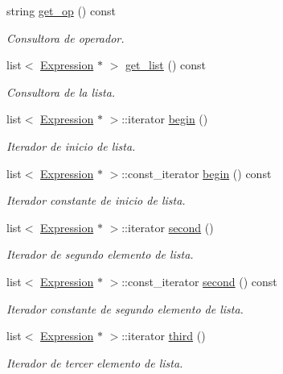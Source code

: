 \begin{DoxyCompactItemize}
string \hyperlink{class_expression_a9216cba5bbd3ffa8c3a625a66b91b36f}{get\+\_\+op} () const 
\begin{DoxyCompactList}\small\item\em Consultora de operador. \end{DoxyCompactList}\item 
list$<$ \hyperlink{class_expression}{Expression} $\ast$ $>$ \hyperlink{class_expression_a02b464bb904f9e47806c3ace82f9ce40}{get\+\_\+list} () const 
\begin{DoxyCompactList}\small\item\em Consultora de la lista. \end{DoxyCompactList}\item 
list$<$ \hyperlink{class_expression}{Expression} $\ast$ $>$\+::iterator \hyperlink{class_expression_a2d506d902ad4cc9c0e674ae53c89e846}{begin} ()
\begin{DoxyCompactList}\small\item\em Iterador de inicio de lista. \end{DoxyCompactList}\item 
list$<$ \hyperlink{class_expression}{Expression} $\ast$ $>$\+::const\+\_\+iterator \hyperlink{class_expression_af19f7a8509a9d6e77360d082d6d9b488}{begin} () const 
\begin{DoxyCompactList}\small\item\em Iterador constante de inicio de lista. \end{DoxyCompactList}\item 
list$<$ \hyperlink{class_expression}{Expression} $\ast$ $>$\+::iterator \hyperlink{class_expression_a27233f1069927e3006cadabf17402e73}{second} ()
\begin{DoxyCompactList}\small\item\em Iterador de segundo elemento de lista. \end{DoxyCompactList}\item 
list$<$ \hyperlink{class_expression}{Expression} $\ast$ $>$\+::const\+\_\+iterator \hyperlink{class_expression_a53baf6cfbdc54ea6799daf47ec83cb56}{second} () const 
\begin{DoxyCompactList}\small\item\em Iterador constante de segundo elemento de lista. \end{DoxyCompactList}\item 
list$<$ \hyperlink{class_expression}{Expression} $\ast$ $>$\+::iterator \hyperlink{class_expression_a5b079de9216600ec3611cd3133fd8e36}{third} ()
\begin{DoxyCompactList}\small\item\em Iterador de tercer elemento de lista. \end{DoxyCompactList}\item 

\end{DoxyCompactItemize}
